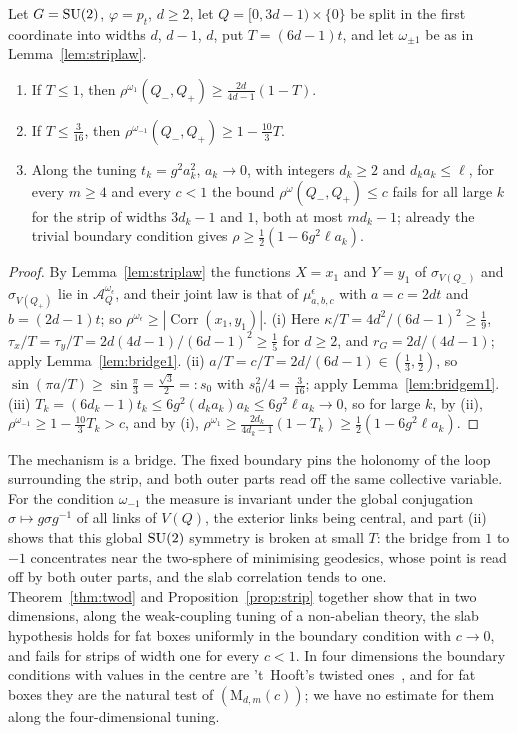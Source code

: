 \begin{proposition}\label{prop:strip}
Let $G=\mathrm{SU}(2)$, $\varphi=p_t$, $d\ge2$, let $Q=[0,3d-1)\times\{0\}$ be split in
the first coordinate into widths $d$, $d-1$, $d$, put $T=(6d-1)t$, and let
$\omega_{\pm1}$ be as in Lemma~\ref{lem:striplaw}.
\begin{enumerate}[label=\textup{(\roman*)},leftmargin=*]
\item If $T\le1$, then $\rho^{\omega_1}(Q_-,Q_+)\ge\frac{2d}{4d-1}(1-T)$.
\item If $T\le\frac3{16}$, then $\rho^{\omega_{-1}}(Q_-,Q_+)\ge1-\frac{10}3T$.
\item Along the tuning $t_k=g^2a_k^2$, $a_k\to0$, with integers $d_k\ge2$ and
$d_ka_k\le\ell$, for every $m\ge4$ and every $c<1$ the bound $\rho^\omega(Q_-,
Q_+)\le c$ fails for all large $k$ for the strip of widths $3d_k-1$ and $1$,
both at most $md_k-1$; already the trivial boundary condition gives $\rho\ge
\frac12(1-6g^2\ell a_k)$.
\end{enumerate}
\end{proposition}

\begin{proof}
By Lemma~\ref{lem:striplaw} the functions $X=x_1$ and $Y=y_1$ of
$\sigma_{V(Q_-)}$ and $\sigma_{V(Q_+)}$ lie in $\mathcal A^{\omega_\epsilon}_Q$,
and their joint law is that of $\mu^\epsilon_{a,b,c}$ with $a=c=2dt$ and $b=(2d-
1)t$; so $\rho^{\omega_\epsilon}\ge|\operatorname{Corr}(x_1,y_1)|$. (i) Here
$\kappa/T=4d^2/(6d-1)^2\ge\frac19$, $\tau_x/T=\tau_y/T=2d(4d-1)/(6d-1)^2\ge\frac15$
for $d\ge2$, and $r_G=2d/(4d-1)$; apply Lemma~\ref{lem:bridge1}. (ii) $a/T=c/T=
2d/(6d-1)\in(\frac13,\frac12)$, so $\sin(\pi a/T)\ge\sin\frac\pi3=\frac{\sqrt3}2=
:s_0$ with $s_0^2/4=\frac3{16}$; apply Lemma~\ref{lem:bridgem1}. (iii)
$T_k=(6d_k-1)t_k\le6g^2(d_ka_k)a_k\le6g^2\ell a_k\to0$, so for large $k$, by
(ii), $\rho^{\omega_{-1}}\ge1-\frac{10}3T_k>c$, and by (i), $\rho^{\omega_1}\ge
\frac{2d_k}{4d_k-1}(1-T_k)\ge\frac12(1-6g^2\ell a_k)$.
\end{proof}

The mechanism is a bridge. The fixed boundary pins the holonomy of the loop
surrounding the strip, and both outer parts read off the same collective
variable. For the condition $\omega_{-1}$ the measure is invariant under the
global conjugation $\sigma\mapsto g\sigma g^{-1}$ of all links of $V(Q)$, the
exterior links being central, and part (ii) shows that this global $\mathrm{SU}(2)$
symmetry is broken at small $T$: the bridge from $1$ to $-1$ concentrates near
the two-sphere of minimising geodesics, whose point is read off by both outer
parts, and the slab correlation tends to one. Theorem~\ref{thm:twod} and
Proposition~\ref{prop:strip} together show that in two dimensions, along the
weak-coupling tuning of a non-abelian theory, the slab hypothesis holds for fat
boxes uniformly in the boundary condition with $c\to0$, and fails for strips
of width one for every $c<1$. In four dimensions the boundary conditions with
values in the centre are 't~Hooft's twisted ones~\cite{tH79}, and for fat boxes
they are the natural test of $(\mathrm M_{d,m}(c))$; we have no estimate for
them along the four-dimensional tuning.

